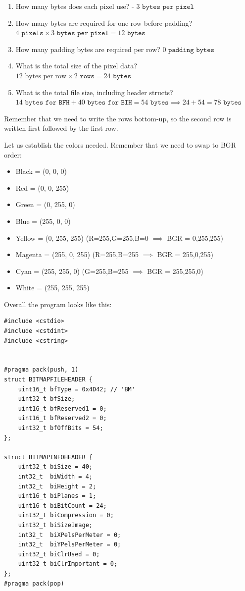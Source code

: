 \begin{Answer}[ref=bitmapsExercise2]
\begin{enumerate}
    \item How many bytes does each pixel use? - $3 \texttt{ bytes per pixel}$
    \item How many bytes are required for one row before padding? $4 \texttt{ pixels} \times 3 \texttt{ bytes per pixel}= 12 \texttt{ bytes}$
    \item How many padding bytes are required per row? $0 \texttt{ padding bytes}$
    \item What is the total size of the pixel data? $12 \text{ bytes per row} \times 2 \texttt{ rows} = 24 \texttt{ bytes}$
    \item What is the total file size, including header structs? $14 \texttt{ bytes for BFH} + 40 \texttt{ bytes for BIH} = 54 \texttt{ bytes} \implies 24 + 54 = 78\texttt{ bytes}$
\end{enumerate}

Remember that we need to write the rows bottom-up, so the second row is written first followed by the first row.

Let us establish the colors needed. Remember that we need to swap to BGR order:
\begin{itemize}
    \item Black = (0, 0, 0)
    \item Red = (0, 0, 255)
    \item Green = (0, 255, 0)
    \item Blue = (255, 0, 0)
    \item Yellow = (0, 255, 255) (R=255,G=255,B=0 $\implies$ BGR = 0,255,255)
    \item Magenta = (255, 0, 255) (R=255,B=255 $\implies$ BGR = 255,0,255)
    \item Cyan = (255, 255, 0) (G=255,B=255 $\implies$ BGR = 255,255,0)
    \item White = (255, 255, 255)
\end{itemize}

Overall the program looks like this:
\begin{verbatim}
#include <cstdio>
#include <cstdint>
#include <cstring>


#pragma pack(push, 1)
struct BITMAPFILEHEADER {
    uint16_t bfType = 0x4D42; // 'BM'
    uint32_t bfSize;
    uint16_t bfReserved1 = 0;
    uint16_t bfReserved2 = 0;
    uint32_t bfOffBits = 54;
};

struct BITMAPINFOHEADER {
    uint32_t biSize = 40;
    int32_t  biWidth = 4;
    int32_t  biHeight = 2;
    uint16_t biPlanes = 1;
    uint16_t biBitCount = 24;
    uint32_t biCompression = 0;
    uint32_t biSizeImage;
    int32_t  biXPelsPerMeter = 0;
    int32_t  biYPelsPerMeter = 0;
    uint32_t biClrUsed = 0;
    uint32_t biClrImportant = 0;
};
#pragma pack(pop)


\end{verbatim}
\end{Answer}
